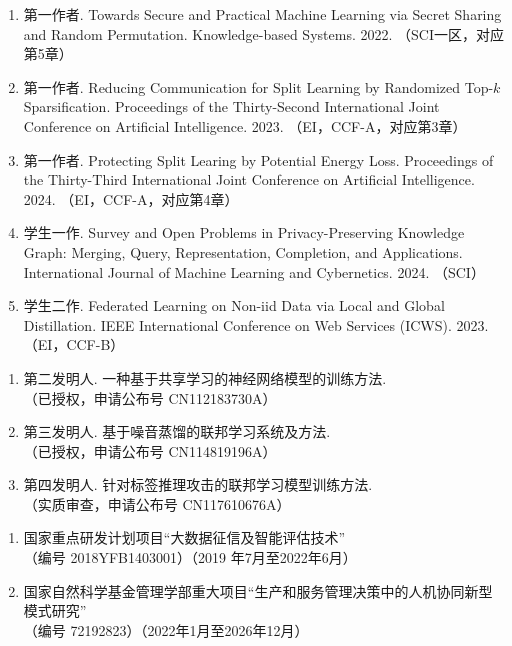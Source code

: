 \cleardoublepage
{}

\begin{enumerate}
    \item 第一作者. Towards Secure and Practical Machine Learning via Secret Sharing and Random Permutation. Knowledge-based Systems. 2022. （SCI一区，对应第5章）
    \item 第一作者. Reducing Communication for Split Learning by Randomized Top-$k$ Sparsification. Proceedings of the Thirty-Second International Joint Conference on Artificial Intelligence. 2023. （EI，CCF-A，对应第3章）
    \item 第一作者. Protecting Split Learing by Potential Energy Loss. Proceedings of the Thirty-Third International Joint Conference on Artificial Intelligence. 2024. （EI，CCF-A，对应第4章）
    \item 学生一作. Survey and Open Problems in Privacy-Preserving Knowledge Graph: Merging, Query, Representation, Completion, and Applications. International Journal of Machine Learning and Cybernetics. 2024. （SCI）
    \item 学生二作. Federated Learning on Non-iid Data via Local and Global Distillation. IEEE International Conference on Web Services (ICWS). 2023. （EI，CCF-B）
\end{enumerate}

\begin{enumerate}
    \item 第二发明人. 一种基于共享学习的神经网络模型的训练方法. \\
    （已授权，申请公布号 CN112183730A）
    \item 第三发明人. 基于噪音蒸馏的联邦学习系统及方法. \\
    （已授权，申请公布号
     CN114819196A）
    \item 第四发明人. 针对标签推理攻击的联邦学习模型训练方法. \\
    （实质审查，申请公布号 CN117610676A）
\end{enumerate}



\begin{enumerate}
    \item 国家重点研发计划项目“大数据征信及智能评估技术”\\
    （编号 2018YFB1403001）（2019 年7月至2022年6月）
    \item 国家自然科学基金管理学部重大项目“生产和服务管理决策中的人机协同新型模式研究”\\
    （编号 72192823）（2022年1月至2026年12月）
\end{enumerate}